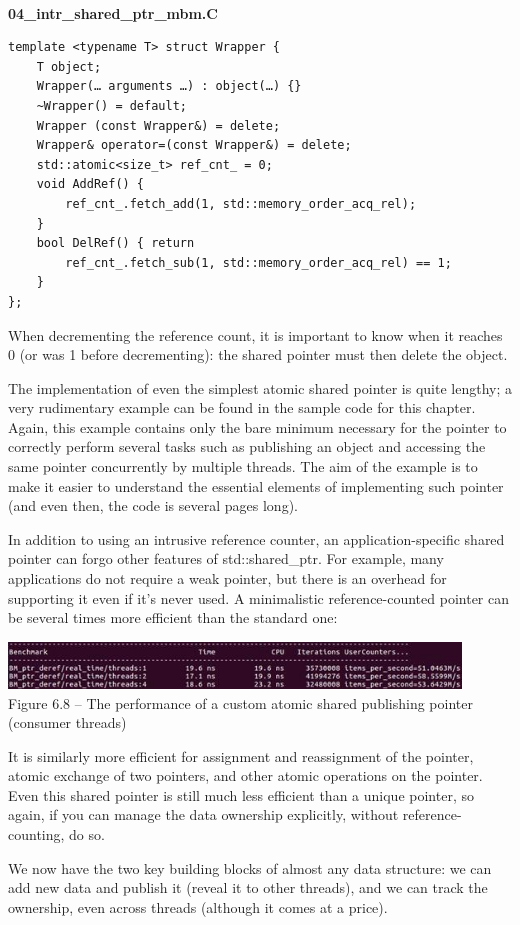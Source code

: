 \hspace*{\fill} \\ %
\noindent
\textbf{04\_intr\_shared\_ptr\_mbm.C}
\begin{lstlisting}[style=styleCXX]
template <typename T> struct Wrapper {
	T object;
	Wrapper(… arguments …) : object(…) {}
	~Wrapper() = default;
	Wrapper (const Wrapper&) = delete;
	Wrapper& operator=(const Wrapper&) = delete;
	std::atomic<size_t> ref_cnt_ = 0;
	void AddRef() {
		ref_cnt_.fetch_add(1, std::memory_order_acq_rel);
	}
	bool DelRef() { return
		ref_cnt_.fetch_sub(1, std::memory_order_acq_rel) == 1;
	}
};
\end{lstlisting}

When decrementing the reference count, it is important to know when it reaches 0 (or was 1 before decrementing): the shared pointer must then delete the object.

The implementation of even the simplest atomic shared pointer is quite lengthy; a very rudimentary example can be found in the sample code for this chapter. Again, this example contains only the bare minimum necessary for the pointer to correctly perform several tasks such as publishing an object and accessing the same pointer concurrently by multiple threads. The aim of the example is to make it easier to understand the essential elements of implementing such pointer (and even then, the code is several pages long).

In addition to using an intrusive reference counter, an application-specific shared pointer can forgo other features of std::shared\_ptr. For example, many applications do not require a weak pointer, but there is an overhead for supporting it even if it's never used. A minimalistic reference-counted pointer can be several times more efficient than the standard one:

\begin{center}
\includegraphics[width=0.9\textwidth]{content/2/chapter6/images/8.jpg}\\
Figure 6.8 – The performance of a custom atomic shared publishing pointer (consumer threads)
\end{center}

It is similarly more efficient for assignment and reassignment of the pointer, atomic exchange of two pointers, and other atomic operations on the pointer. Even this shared pointer is still much less efficient than a unique pointer, so again, if you can manage the data ownership explicitly, without reference-counting, do so.

We now have the two key building blocks of almost any data structure: we can add new data and publish it (reveal it to other threads), and we can track the ownership, even across threads (although it comes at a price).




















